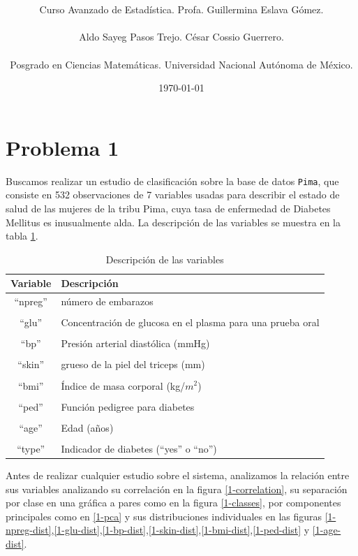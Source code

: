 \documentclass[11pt]{article}
\title{\textbf{\work}}
\author{Curso Avanzado de Estadística. Profa. Guillermina Eslava Gómez.\\ \\ Aldo Sayeg Pasos Trejo. César Cossio Guerrero. \\ \\ Posgrado en Ciencias Matemáticas. Universidad Nacional Autónoma de México. }
\date{\today}
\begin{document}
\maketitle
\section{Problema 1}
Buscamos realizar un estudio de clasificación sobre la base de datos \texttt{Pima}, que consiste en 532 observaciones de 7 variables usadas para describir el estado de salud de las mujeres de la tribu Pima, cuya tasa de enfermedad de Diabetes Mellitus es inusualmente alda. La descripción \cite{3-1} de las variables se muestra en la tabla \ref{1-desc}.
\begin{table}[H]
    \centering
    \begin{tabular}{c|p{8cm}}
        Variable & Descripción \\
        \hline
        ``npreg'' & número de embarazos \\
        & \\
        ``glu'' & Concentración de glucosa en el plasma para una prueba oral \\
        & \\
        ``bp'' &  Presión arterial diastólica (mmHg)\\
        & \\
        ``skin'' & grueso de la piel del triceps (mm) \\
        & \\
        ``bmi'' & Índice de masa corporal (kg/$m^2$) \\
        & \\
        ``ped'' & Función pedigree para diabetes \\
        & \\
        ``age'' & Edad (años) \\
        & \\
        ``type'' & Indicador de diabetes (``yes'' o ``no'') \\
    \end{tabular}
    \caption{Descripción de las variables}
    \label{1-desc}
\end{table}
Antes de realizar cualquier estudio sobre el sistema, analizamos la relación entre sus variables analizando su correlación en la figura \ref{1-correlation}, su separación por clase en una gráfica a pares como en la figura \ref{1-classes}, por componentes principales como en \ref{1-pca} y sus distribuciones individuales en las figuras \ref{1-npreg-dist},\ref{1-glu-dist},\ref{1-bp-dist},\ref{1-skin-dist},\ref{1-bmi-dist},\ref{1-ped-dist} y \ref{1-age-dist}.
\end{document}
